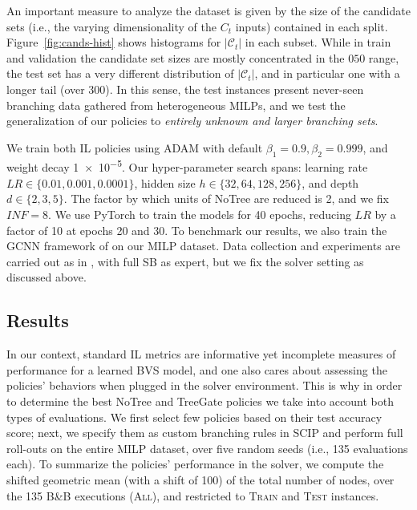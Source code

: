 \documentclass[letterpaper]{article} %
\begin{document}
{An important measure to analyze the dataset is given by the size of the candidate sets (i.e., the varying dimensionality of the $C_t$ inputs) contained in each split.
Figure~\ref{fig:cands-hist} shows histograms for $|\mathcal{C}_t|$ in each subset.
While in train and validation the candidate set sizes are mostly concentrated in the $050$ range, the test set has a very different distribution of $|\mathcal{C}_t|$, and in particular one with a longer tail (over 300).
In this sense, the test instances present never-seen branching data gathered from heterogeneous MILPs, and we test the generalization of our policies to \emph{entirely unknown and larger branching sets}.
}

{
We train both IL policies using ADAM \cite{ADAM} with default $\beta_1=0.9, \beta_2=0.999$, and weight decay \num{1e-5}.
Our hyper-parameter search spans: learning rate $\mathit{LR}\in\{0.01, 0.001, 0.0001\}$, hidden size $h\in\{32, 64, 128, 256\}$, and depth $d\in\{2, 3, 5\}$.
The factor by which units of NoTree are reduced is 2, and we fix $\mathit{INF}=8$.
We use PyTorch \cite{PyTorch} to train the models for 40 epochs, reducing $\mathit{LR}$ by a factor of 10 at epochs 20 and 30.
To benchmark our results, we also train the GCNN framework of \citeauthor{NIPS2019_9690} on our MILP dataset.
Data collection and experiments are carried out as in \citeauthor{NIPS2019_9690}, with full SB as expert, but we fix the solver setting as discussed above.
}

\subsection{Results}
\label{sec:results}

In our context, standard IL metrics are informative yet incomplete measures of performance for a learned BVS model, and one also cares about assessing the policies' behaviors when plugged in the solver environment.
This is why in order to determine the best NoTree and TreeGate policies we take into account both types of evaluations.
We first select few policies based on their test accuracy score; next, we specify them as custom branching rules in SCIP and perform full roll-outs on the entire MILP dataset, over five random seeds (i.e., 135 evaluations each).
To summarize the policies' performance in the solver, we compute the shifted geometric mean (with a shift of 100) of the total number of nodes, over the 135 B\&B executions (\textsc{All}), and restricted to \textsc{Train} and \textsc{Test} instances.
\end{document}
